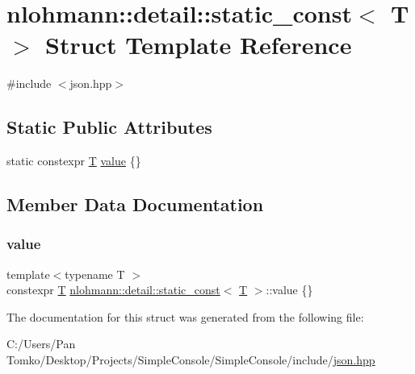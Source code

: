 \hypertarget{structnlohmann_1_1detail_1_1static__const}{}\section{nlohmann\+::detail\+::static\+\_\+const$<$ T $>$ Struct Template Reference}
\label{structnlohmann_1_1detail_1_1static__const}


{\ttfamily \#include $<$json.\+hpp$>$}

\subsection*{Static Public Attributes}
\begin{DoxyCompactItemize}
\item 
static constexpr \mbox{\hyperlink{_keyboard_event_8h_adf1f3edb9115acb0a1e04209b7a9937b}{T}} \mbox{\hyperlink{structnlohmann_1_1detail_1_1static__const_a6bb7ab2ddd6abc41fb4ffb7c6dfa237e}{value}} \{\}
\end{DoxyCompactItemize}


\subsection{Member Data Documentation}
\mbox{\label{structnlohmann_1_1detail_1_1static__const_a6bb7ab2ddd6abc41fb4ffb7c6dfa237e}} 
\subsubsection{\texorpdfstring{value}{value}}
{\footnotesize\ttfamily template$<$typename T $>$ \\
constexpr \mbox{\hyperlink{_keyboard_event_8h_adf1f3edb9115acb0a1e04209b7a9937b}{T}} \mbox{\hyperlink{structnlohmann_1_1detail_1_1static__const}{nlohmann\+::detail\+::static\+\_\+const}}$<$ \mbox{\hyperlink{_keyboard_event_8h_adf1f3edb9115acb0a1e04209b7a9937b}{T}} $>$\+::value \{\}\hspace{0.3cm}{\ttfamily [static]}}



The documentation for this struct was generated from the following file\+:\begin{DoxyCompactItemize}
\item 
C\+:/\+Users/\+Pan Tomko/\+Desktop/\+Projects/\+Simple\+Console/\+Simple\+Console/include/\mbox{\hyperlink{json_8hpp}{json.\+hpp}}\end{DoxyCompactItemize}
